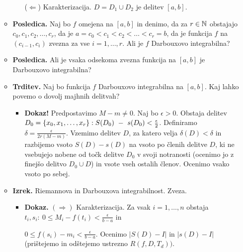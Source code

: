 \begin{enumerate}
\begin{itemize}
\begin{itemize}
            ($\Leftarrow$) Karakterizacija. $D = D_1 \cup D_2$ je delitev $[a, b]$.
        \end{itemize}
        \item \colorbox{orange!30}{\textbf{Posledica.}} Naj bo $f$ omejena na $[a,b]$ in denimo, da za $r \in \mathbb{N}$ obstajajo $c_0, c_1, c_2, \ldots, c_r$, da je $a = c_0 < c_1 < c_2 < \ldots < c_r = b$, da je funkcija $f$ na $(c_{i-1}, c_i)$ zvezna za vse $i = 1, \ldots, r$. Ali je $f$ Darbouxovo integrabilna?
        \item \colorbox{orange!30}{\textbf{Posledica.}} Ali je vsaka odsekoma zvezna funkcija na $[a, b]$ je Darbouxovo integrabilna?
        \item \colorbox{blue!30}{\textbf{Trditev.}} Naj bo funkcija $f$ Darbouxovo integrabilna na $[a, b]$. Kaj lahko povemo o dovolj majhnih delitvah?
        \begin{itemize}
            \item \colorbox{green!50}{\textbf{Dokaz!}} Predpostavimo $M-m \neq 0$. Naj bo $\epsilon > 0$. Obstaja delitev $D_0 = \left\{x_0, x_1, \ldots, x_r\right\}: \\ S(D_0)~-~s(D_0) < \frac{\epsilon}{2}$. Definiramo $\delta = \frac{\epsilon}{2r(M-m)}$. Vzemimo delitev $D$, za katero velja $\delta(D) < \delta$ in razbijemo vsoto $S(D) - s(D)$ na vsoto po členih delitve $D$, ki ne vsebujejo nobene od točk delitve $D_0$ v svoji notranosti (ocenimo jo z finejšo delitvo $D_0 \cup D$) in vsote vseh ostalih členov. Ocenimo vsako vsoto po sebej.
        \end{itemize}
        \item \colorbox{blue!30}{\textbf{Izrek.}} Riemannova in Darbouxova integrabilnost. Zveza.
        \begin{itemize}
            \item \colorbox{green!30}{\textbf{Dokaz.}} $(\Rightarrow)$ Karakterizacija. Za vsak $i = 1, \ldots, n$ obstaja $t_i, s_i: \ 0 \leq M_i - f(t_i) < \frac{\epsilon}{b-a}$ in 
            
            $0 \leq f(s_i) - m_i < \frac{\epsilon}{b-a}$. Ocenimo $|S(D) - I|$ in $|s(D) - I|$ (prištejemo in odštejemo ustrezno $R(f, D, T_d))$.


\end{itemize}
\end{itemize}
\end{enumerate}
